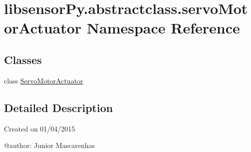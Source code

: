 \hypertarget{namespacelibsensorPy_1_1abstractclass_1_1servoMotorActuator}{}\section{libsensor\+Py.\+abstractclass.\+servo\+Motor\+Actuator Namespace Reference}
\label{namespacelibsensorPy_1_1abstractclass_1_1servoMotorActuator}
\subsection*{Classes}
\begin{DoxyCompactItemize}
\item 
class \hyperlink{classlibsensorPy_1_1abstractclass_1_1servoMotorActuator_1_1ServoMotorActuator}{Servo\+Motor\+Actuator}
\end{DoxyCompactItemize}


\subsection{Detailed Description}
\begin{DoxyVerb}Created on 01/04/2015

@author: Junior Mascarenhas
\end{DoxyVerb}
 